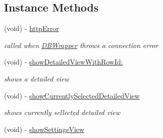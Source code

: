 \subsection*{Instance Methods}
\begin{DoxyCompactItemize}
\item 
\hypertarget{interface_virt_tour_view_controller_a7ba3f39280d7772b515d51f9d29f2f69}{(void) -\/ \hyperlink{interface_virt_tour_view_controller_a7ba3f39280d7772b515d51f9d29f2f69}{http\-Error}}\label{interface_virt_tour_view_controller_a7ba3f39280d7772b515d51f9d29f2f69}

\begin{DoxyCompactList}\small\item\em called when \hyperlink{interface_d_b_wrapper}{D\-B\-Wrapper} throws a connection error \end{DoxyCompactList}\item 
(void) -\/ \hyperlink{interface_virt_tour_view_controller_aad30a8527c4001182ea88f62b6065944}{show\-Detailed\-View\-With\-Row\-Id\-:}
\begin{DoxyCompactList}\small\item\em shows a detailed view \end{DoxyCompactList}\item 
\hypertarget{interface_virt_tour_view_controller_ad9c6f03d61cbd98f30ba1abbedd5b6ba}{(void) -\/ \hyperlink{interface_virt_tour_view_controller_ad9c6f03d61cbd98f30ba1abbedd5b6ba}{show\-Currently\-Selected\-Detailed\-View}}\label{interface_virt_tour_view_controller_ad9c6f03d61cbd98f30ba1abbedd5b6ba}

\begin{DoxyCompactList}\small\item\em shows currently sellected detailed view \end{DoxyCompactList}\item 
\hypertarget{interface_virt_tour_view_controller_ae3c87c14ac49d18c3f3ea69650311440}{(void) -\/ \hyperlink{interface_virt_tour_view_controller_ae3c87c14ac49d18c3f3ea69650311440}{show\-Settings\-View}}\label{interface_virt_tour_view_controller_ae3c87c14ac49d18c3f3ea69650311440}


\end{DoxyCompactItemize}
